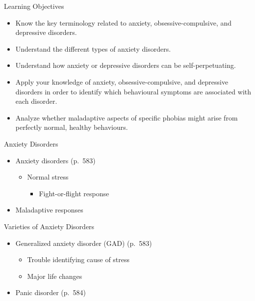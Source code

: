 \documentclass[
]{book}
\providecommand{\tightlist}{%
  \setlength{\itemsep}{0pt}\setlength{\parskip}{0pt}}
\begin{document}
\begin{reflect}
Learning Objectives

\begin{itemize}
\tightlist
\item
  Know the key terminology related to anxiety, obsessive-compulsive, and depressive disorders.\\
\item
  Understand the different types of anxiety disorders.\\
\item
  Understand how anxiety or depressive disorders can be self-perpetuating.\\
\item
  Apply your knowledge of anxiety, obsessive-compulsive, and depressive disorders in order to identify which behavioural symptoms are associated with each disorder.\\
\item
  Analyze whether maladaptive aspects of specific phobias might arise from perfectly normal, healthy behaviours.
\end{itemize}

Anxiety Disorders

\begin{itemize}
\tightlist
\item
  Anxiety disorders (p.~583)

  \begin{itemize}
  \tightlist
  \item
    Normal stress

    \begin{itemize}
    \tightlist
    \item
      Fight-or-flight response\\
    \end{itemize}
  \end{itemize}
\item
  Maladaptive responses
\end{itemize}

Varieties of Anxiety Disorders

\begin{itemize}
\tightlist
\item
  Generalized anxiety disorder (GAD) (p.~583)

  \begin{itemize}
  \tightlist
  \item
    Trouble identifying cause of stress\\
  \item
    Major life changes\\
  \end{itemize}
\item
  Panic disorder (p.~584)


\end{itemize}
\end{reflect}
\end{document}
